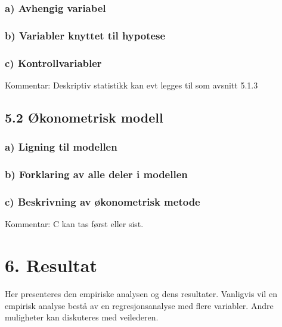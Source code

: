 \documentclass[
  12pt,
  a4paper,
  DIV=11,
  numbers=noendperiod]{scrartcl}
\begin{document}
\subsubsection{a) Avhengig variabel}\label{a-avhengig-variabel}

\subsubsection{b) Variabler knyttet til
hypotese}\label{b-variabler-knyttet-til-hypotese}

\subsubsection{c) Kontrollvariabler}\label{c-kontrollvariabler}

Kommentar: Deskriptiv statistikk kan evt legges til som avsnitt 5.1.3

\subsection{5.2 Økonometrisk modell}\label{uxf8konometrisk-modell}

\subsubsection{a) Ligning til modellen}\label{a-ligning-til-modellen}

\subsubsection{b) Forklaring av alle deler i
modellen}\label{b-forklaring-av-alle-deler-i-modellen}

\subsubsection{c) Beskrivning av økonometrisk
metode}\label{c-beskrivning-av-uxf8konometrisk-metode}

Kommentar: C kan tas først eller sist.

\section{6. Resultat}\label{resultat}

Her presenteres den empiriske analysen og dens resultater. Vanligvis vil
en empirisk analyse bestå av en regresjonsanalyse med flere variabler.
Andre muligheter kan diskuteres med veilederen.
\end{document}
